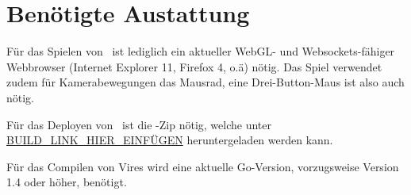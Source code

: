 \section{Benötigte Austattung}
Für das Spielen von \vires\ ist lediglich ein aktueller WebGL- und Websockets-fähiger Webbrowser (Internet Explorer 11, Firefox 4, o.ä) nötig.
Das Spiel verwendet zudem für Kamerabewegungen das Mausrad, eine Drei-Button-Maus ist also auch nötig.

Für das Deployen von \vires\ ist die \vires-Zip nötig, welche unter \url{BUILD_LINK_HIER_EINFÜGEN} heruntergeladen werden kann.

Für das Compilen von Vires wird eine aktuelle Go-Version, vorzugsweise Version 1.4 oder höher, benötigt.